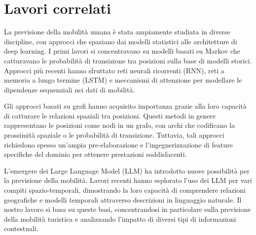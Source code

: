 \section{Lavori correlati}

La previsione della mobilità umana è stata ampiamente studiata in diverse discipline, con approcci che spaziano dai modelli statistici alle architetture di deep learning. I primi lavori si concentravano su modelli basati su Markov che catturavano le probabilità di transizione tra posizioni sulla base di modelli storici. Approcci più recenti hanno sfruttato reti neurali ricorrenti (RNN), reti a memoria a lungo termine (LSTM) e meccanismi di attenzione per modellare le dipendenze sequenziali nei dati di mobilità.

Gli approcci basati su grafi hanno acquisito importanza grazie alla loro capacità di catturare le relazioni spaziali tra posizioni. Questi metodi in genere rappresentano le posizioni come nodi in un grafo, con archi che codificano la prossimità spaziale o le probabilità di transizione. Tuttavia, tali approcci richiedono spesso un'ampia pre-elaborazione e l'ingegnerizzazione di feature specifiche del dominio per ottenere prestazioni soddisfacenti.

L'emergere dei Large Language Model (LLM) ha introdotto nuove possibilità per la previsione della mobilità. Lavori recenti hanno esplorato l'uso dei LLM per vari compiti spazio-temporali, dimostrando la loro capacità di comprendere relazioni geografiche e modelli temporali attraverso descrizioni in linguaggio naturale. Il nostro lavoro si basa su queste basi, concentrandosi in particolare sulla previsione della mobilità turistica e analizzando l'impatto di diversi tipi di informazioni contestuali.
